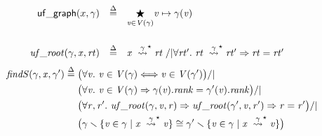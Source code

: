 \begin{flushleft}
\begin{equation*}
\begin{array}{@{}l@{}lcl@{}}
\multicolumn{2}{r}{\p{uf\_graph}(x, \gamma)} & \defeq & \underset{\m{v} \in \m{V}(\gamma)}{\bigstar} \m{v}	\mapsto\gamma(\m{v}) \\
[25pt]
\m{uf\_root}(\gamma,\m{x},\m{rt})&& \defeq & \reachable{x}{\gamma}{\star}{}{rt} \; /| {\forall \m{rt'}.~\reachable{rt}{\gamma}{\star}{}{rt'} => \m{rt} = \m{rt'}}
\end{array}
\end{equation*}
\begin{equation*}
\begin{split}
\quad \m{findS}(\gamma,\m{x},\gamma') \; \defeq \; &\big(\forall \m{v}.~ \m{v}\in\m{V}(\gamma) <=> \m{v}\in\m{V}(\gamma') \big) /| \null \\
&\big(\forall \m{v}.~\m{v}\in\m{V}(\gamma) => \gamma(\m{v}).\m{rank} = \gamma'(\m{v}).\m{rank} \big) /| \null \\
&\big(\forall \m{r},\m{r'}.~\m{uf\_root}(\gamma, \m{v}, \m{r}) => \m{uf\_root}(\gamma', \m{v}, \m{r'}) => \m{r} = \m{r'} \big) /|  \null \\
&\big(\gamma \smallsetminus \{\m{v} \in \gamma \mid \reachable{x}{\gamma}{\star}{}{v}\} \cong \gamma' \smallsetminus \{\m{v} \in \gamma \mid \reachable{x}{\gamma}{\star}{}{v}\}\big)
\end{split}
\end{equation*}
\end{flushleft}

